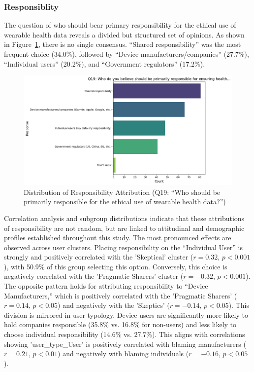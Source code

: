 	\subsubsection{Responsiblity}
		The question of who should bear primary responsibility for the ethical use of wearable health data reveals a divided but structured set of opinions. As shown in Figure~\ref{fig:responsibility_q19}, there is no single consensus. ``Shared responsibility'' was the most frequent choice (34.0\%), followed by ``Device manufacturers/companies'' (27.7\%), ``Individual users'' (20.2\%), and ``Government regulators'' (17.2\%).
		\begin{figure}[h!]\centering
			\includegraphics[width=0.7\linewidth]{figures/img/subgroup_ana/Q19_overall_dist.png}
			\caption{Distribution of Responsibility Attribution (Q19: ``Who should be primarily responsible for the ethical use of wearable health data?'')}
			\label{fig:responsibility_q19}
		\end{figure}
		Correlation analysis and subgroup distributions indicate that these attributions of responsibility are not random, but are linked to attitudinal and demographic profiles established throughout this study. The most pronounced effects are observed across user clusters. Placing responsibility on the ``Individual User'' is strongly and positively correlated with the 'Skeptical' cluster ($r = 0.32$, $p < 0.001$), with 50.9\% of this group selecting this option. Conversely, this choice is negatively correlated with the 'Pragmatic Sharers' cluster ($r = -0.32$, $p < 0.001$). The opposite pattern holds for attributing responsibility to ``Device Manufacturers,'' which is positively correlated with the 'Pragmatic Sharers' ($r = 0.14$, $p < 0.05$) and negatively with the 'Skeptics' ($r = -0.14$, $p < 0.05$).
		This division is mirrored in user typology. Device users are significantly more likely to hold companies responsible (35.8\% vs. 16.8\% for non-users) and less likely to choose individual responsibility (14.6\% vs. 27.7\%). This aligns with correlations showing 'user\_type\_User' is positively correlated with blaming manufacturers ($r = 0.21$, $p < 0.01$) and negatively with blaming individuals ($r = -0.16$, $p < 0.05$).
